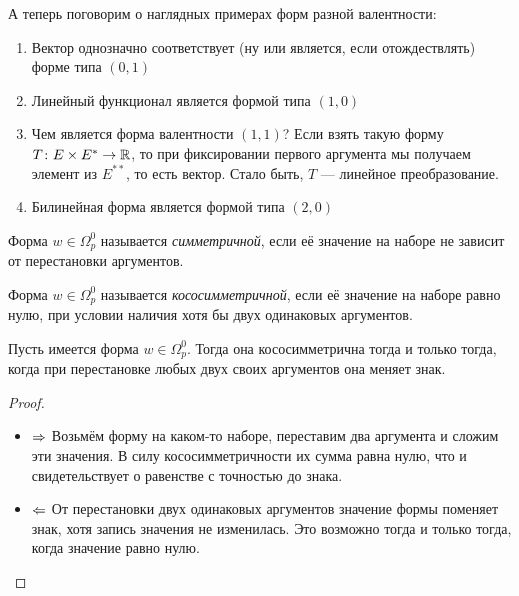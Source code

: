 \begin{example}
	А теперь поговорим о наглядных примерах форм разной валентности:
	\begin{enumerate}
		\item Вектор однозначно соответствует (ну или является, если отождествлять) форме типа $(0, 1)$
		
		\item Линейный функционал является формой типа $(1, 0)$
		
		\item Чем является форма валентности $(1, 1)$? Если взять такую форму $T \colon E \times E^* \to \mathbb{R}$, то при фиксировании первого аргумента мы получаем элемент из $E^{**}$, то есть вектор. Стало быть, $T$ --- линейное преобразование.
		
		\item Билинейная форма является формой типа $(2, 0)$
	\end{enumerate}
\end{example}

\begin{definition}
	Форма $w \in \Omega_p^0$ называется \textit{симметричной}, если её значение на наборе не зависит от перестановки аргументов.
\end{definition}

\begin{definition}
	Форма $w \in \Omega_p^0$ называется \textit{кососимметричной}, если её значение на наборе равно нулю, при условии наличия хотя бы двух одинаковых аргументов.
\end{definition}

\begin{proposition}
	Пусть имеется форма $w \in \Omega_p^0$. Тогда она кососимметрична тогда и только тогда, когда при перестановке любых двух своих аргументов она меняет знак.
\end{proposition}

\begin{proof}~
	\begin{itemize}
		\item $\Rightarrow$ Возьмём форму на каком-то наборе, переставим два аргумента и сложим эти значения. В силу кососимметричности их сумма равна нулю, что и свидетельствует о равенстве с точностью до знака.
		
		\item $\Leftarrow$ От перестановки двух одинаковых аргументов значение формы поменяет знак, хотя запись значения не изменилась. Это возможно тогда и только тогда, когда значение равно нулю.
	\end{itemize}
\end{proof}

